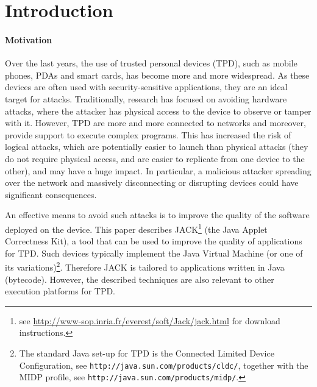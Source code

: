 \section{Introduction}\label{SecIntro}

\paragraph{Motivation}

Over the last years, the use of trusted personal devices (TPD), such
as mobile phones, PDAs and smart cards, has become more and more
widespread. As these devices are often used with security-sensitive
applications, they are an ideal target for attacks. Traditionally,
research has focused on avoiding hardware attacks, where the attacker
has physical access to the device to observe or tamper with
it. However, TPD are more and more connected to networks and moreover,
provide support to execute complex programs. This has increased the
risk of logical attacks, which are potentially easier to launch than
physical attacks (they do not require physical access, and are easier
to replicate from one device to the other), and may have a huge
impact.  In particular, a malicious attacker spreading over the
network and massively disconnecting or disrupting devices could have
significant consequences.

An effective means to avoid such attacks is to improve the quality of
the software deployed on the device. %
\setcounter{footnote}{0}
This paper describes JACK\footnote{see \url{http://www-sop.inria.fr/everest/soft/Jack/jack.html} for download instructions.} (the Java Applet Correctness Kit), a tool
that can be used to improve the quality of applications for TPD. Such
devices typically implement the Java Virtual Machine (or one of its
variations)\footnote{The standard Java set-up for TPD is the Connected
Limited Device Configuration, see 
\texttt{http://java.sun.com/products/cldc/}, together with the MIDP
profile, see \texttt{http://java.sun.com/products/midp/}.}. Therefore
JACK is tailored to applications written in Java (bytecode). However,
the described techniques are also relevant to other execution
platforms for TPD.




